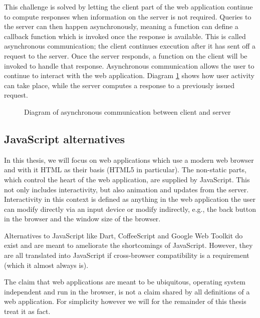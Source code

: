 \documentclass[thesis.tex]{subfiles}
\begin{document}
This challenge is solved by letting the client part of the web application
continue to compute responses when information on the server is not required.
Queries to the server can then happen asynchronously, meaning a function can
define a callback function which is invoked once the response is available. This
is called asynchronous communication; the client continues execution after it
has sent off a request to the server. Once the server responds, a function on
the client will be invoked to handle that response.
Asynchronous communication allows the user to continue to interact with the
web application. Diagram \ref{fig:asynchronous} shows how user activity can
take place, while the server computes a response to a previously issued request.

\begin{figure}
	\centering
	\resizebox{\linewidth}{!}{}
	\caption{Diagram of asynchronous communication between client and server}
	\label{fig:asynchronous}
\end{figure}

\subsection{JavaScript alternatives}
\label{sec:javascript-alts}
In this thesis, we will focus on web applications which use a
modern web browser and with it HTML as their basis (HTML5 in particular).
The non-static parts, which control the heart of the web application,
are supplied by JavaScript. This not only includes interactivity, but also
animation and updates from the server.\\
Interactivity in this context is defined as anything in the web application
the user can modify directly via an input device or modify indirectly, e.g.,
the back button in the browser and the window size of the browser.

Alternatives to JavaScript like Dart, CoffeeScript and Google Web Toolkit
do exist and are meant to ameliorate the shortcomings of JavaScript. 
However, they are all translated into JavaScript if cross-browser
compatibility is a requirement (which it almost always is).

The claim that web applications are meant to be ubiquitous,
operating system independent and run in the browser, is not a claim shared
by all definitions of a web application. For simplicity however we will for the
remainder of this thesis treat it as fact.
\end{document}
